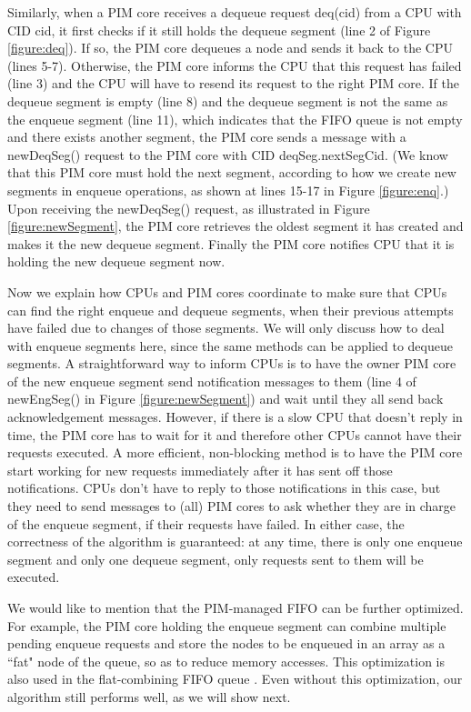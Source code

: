 \documentclass[11pt]{article}
\begin{document}
Similarly, when a PIM core receives a dequeue request deq(cid) from a CPU with CID cid,
it first checks if it still holds the dequeue segment (line 2 of Figure \ref{figure:deq}).
If so, the PIM core dequeues a node and sends it back to the CPU (lines 5-7).
Otherwise, the PIM core informs the CPU that this request has failed (line 3) and
the CPU will have to resend its request to the right PIM core.
If the dequeue segment is empty (line 8) and the dequeue segment is not the same as 
the enqueue segment (line 11), which indicates that the FIFO queue is not empty 
and there exists another segment, the PIM core sends a message with a newDeqSeg() request 
to the PIM core with CID deqSeg.nextSegCid. 
(We know that this PIM core must hold the next segment, 
according to how we create new segments in enqueue operations, 
as shown at lines 15-17 in Figure \ref{figure:enq}.) 
Upon receiving the newDeqSeg() request, as illustrated in Figure \ref{figure:newSegment}, 
the PIM core retrieves the oldest segment it has created and makes it the new dequeue segment.    Finally the PIM core notifies CPU that it is holding the new dequeue segment now.

Now we explain how CPUs and PIM cores coordinate to make sure that CPUs can find the right enqueue 
and dequeue segments, when their previous attempts have failed due to changes of those segments. 
We will only discuss how to deal with enqueue segments here, 
since the same methods can be applied to dequeue segments. 
A straightforward way to inform CPUs is to have the owner PIM core of the new enqueue segment 
send notification messages to them (line 4 of newEngSeg() in Figure \ref{figure:newSegment}) 
and wait until they all send back acknowledgement messages. 
However, if there is a slow CPU that doesn't reply in time, 
the PIM core has to wait for it and therefore other CPUs cannot have their requests executed. 
A more efficient, non-blocking method is to have the PIM core start working for new requests 
immediately after it has sent off those notifications. 
CPUs don't have to reply to those notifications in this case, but they need to send messages 
to (all) PIM cores to ask whether they are in charge of the enqueue segment, 
if their requests have failed.
In either case, the correctness of the algorithm is guaranteed:  
at any time, there is only one enqueue segment and only one dequeue segment, 
only requests sent to them will be executed. 
  
We would like to mention that the PIM-managed FIFO can be further optimized. 
For example, the PIM core holding the enqueue segment can combine multiple pending enqueue requests 
and store the nodes to be enqueued in an array as a ``fat" node of the queue, 
so as to reduce memory accesses. 
This optimization is also used in the flat-combining FIFO queue \cite{Hendler10}. 
Even without this optimization, our algorithm still performs well, as we will show next. 
\end{document}
